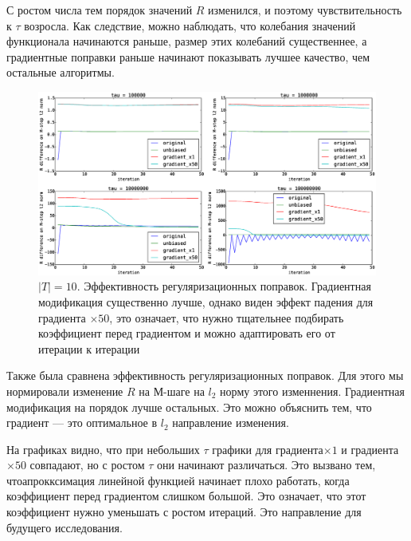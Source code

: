 \documentclass[12pt, twoside]{article}
\begin{document}
С ростом числа тем порядок значений $R$ изменился, и поэтому чувствительность к $\tau$ возросла. Как следствие, можно наблюдать, что колебания значений функционала начинаются раньше, размер этих колебаний существеннее, а градиентные поправки раньше начинают показывать лучшее качество, чем остальные алгоритмы.

\begin{figure}[!ht]
	\centering 
	\includegraphics[width=1.0\linewidth]{paper_pictures/topics_10_RMstepDiffPerL2}
	\caption{$|T| = 10$.  Эффективность регуляризационных поправок. Градиентная модификация существенно лучше, однако виден эффект падения для градиента $\times50$, это означает, что нужно тщательнее подбирать коэффициент перед градиентом и можно адаптировать его от итерации к итерации}   
\end{figure}

Также была сравнена эффективность регуляризационных поправок. Для этого мы нормировали изменение $R$ на М-шаге на $l_2$ норму этого изменнения. Градиентная модификация на порядок лучше остальных. Это можно объяснить тем, что градиент --- это оптимальное в $l_2$ направление изменения.

На графиках видно, что при небольших $\tau$ графики для градиента$\times 1$ и градиента $\times 50$ совпадают, но с ростом $\tau$ они начинают различаться. Это вызвано тем, чтоапрокксимация линейной функцией начинает плохо работать, когда коэффициент перед градиентом слишком большой. Это означает, что этот коэффициент нужно уменьшать с ростом итераций. Это направление для будущего исследования.
\end{document}
